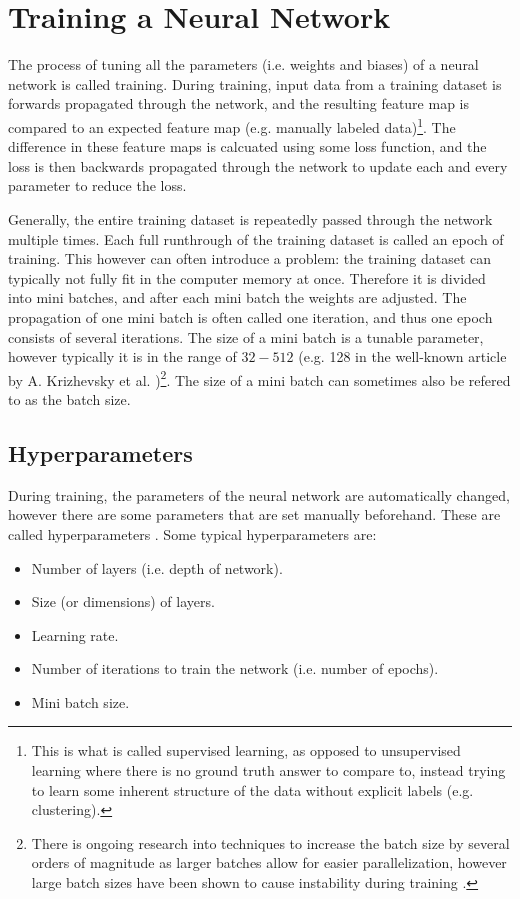 \section{Training a Neural Network}
The process of tuning all the parameters (i.e. weights and biases) of a neural network is called training. During training, input data from a training dataset is forwards propagated through the network, and the resulting feature map is compared to an expected feature map (e.g. manually labeled data)\footnote{This is what is called supervised learning, as opposed to unsupervised learning where there is no ground truth answer to compare to, instead trying to learn some inherent structure of the data without explicit labels (e.g. clustering). }. The difference in these feature maps is calcuated using some loss function, and the loss is then backwards propagated through the network to update each and every parameter to reduce the loss. 

Generally, the entire training dataset is repeatedly passed through the network multiple times. Each full runthrough of the training dataset is called an epoch of training. This however can often introduce a problem: the training dataset can typically not fully fit in the computer memory at once. Therefore it is divided into mini batches, and after each mini batch the weights are adjusted. The propagation of one mini batch is often called one iteration, and thus one epoch consists of several iterations. The size of a mini batch is a tunable parameter, however typically it is in the range of $32-512$ (e.g. 128 in the well-known article by A. Krizhevsky et al. \cite{alexnet})\footnote{There is ongoing research into techniques to increase the batch size by several orders of magnitude as larger batches allow for easier parallelization, however large batch sizes have been shown to cause instability during training \cite{you2017large}. }. The size of a mini batch can sometimes also be refered to as the batch size. 

\subsection{Hyperparameters}
During training, the parameters of the neural network are automatically changed, however there are some parameters that are set manually beforehand. These are called hyperparameters \cite{claesen2015hyperparameter}. Some typical hyperparameters are:
\begin{itemize}
    \item Number of layers (i.e. depth of network).
    \item Size (or dimensions) of layers.
    \item Learning rate.
    \item Number of iterations to train the network (i.e. number of epochs).
    \item Mini batch size.
\end{itemize}

